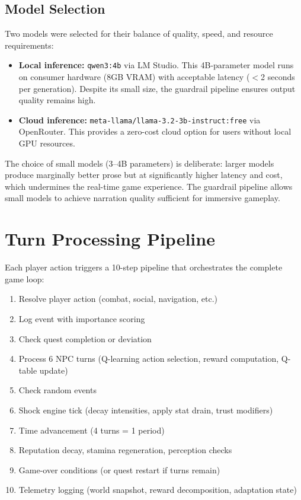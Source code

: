 \documentclass[12pt, a4paper, oneside]{report}
\begin{document}
\subsection{Model Selection}

Two models were selected for their balance of quality, speed, and resource requirements:

\begin{itemize}[nosep]
    \item \textbf{Local inference:} \texttt{qwen3:4b} via LM Studio. This 4B-parameter model runs on consumer hardware (8GB VRAM) with acceptable latency ($<$2 seconds per generation). Despite its small size, the guardrail pipeline ensures output quality remains high.
    \item \textbf{Cloud inference:} \texttt{meta-llama/llama-3.2-3b-instruct:free} via OpenRouter. This provides a zero-cost cloud option for users without local GPU resources.
\end{itemize}

The choice of small models (3--4B parameters) is deliberate: larger models produce marginally better prose but at significantly higher latency and cost, which undermines the real-time game experience. The guardrail pipeline allows small models to achieve narration quality sufficient for immersive gameplay.

\section{Turn Processing Pipeline}
\label{sec:turn-pipeline}

Each player action triggers a 10-step pipeline that orchestrates the complete game loop:
\begin{enumerate}[nosep]
    \item Resolve player action (combat, social, navigation, etc.)
    \item Log event with importance scoring
    \item Check quest completion or deviation
    \item Process 6 NPC turns (Q-learning action selection, reward computation, Q-table update)
    \item Check random events
    \item Shock engine tick (decay intensities, apply stat drain, trust modifiers)
    \item Time advancement (4 turns = 1 period)
    \item Reputation decay, stamina regeneration, perception checks
    \item Game-over conditions (or quest restart if turns remain)
    \item Telemetry logging (world snapshot, reward decomposition, adaptation state)
\end{enumerate}
\end{document}
